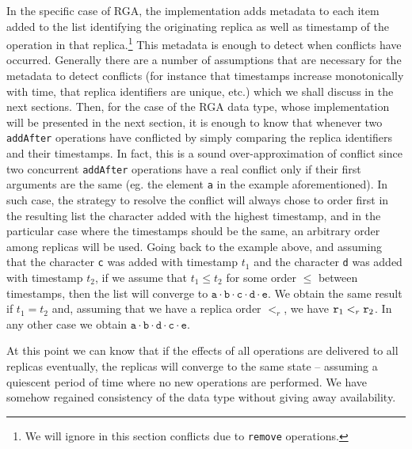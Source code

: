 

In the specific case of RGA, the implementation adds metadata to each
item added to the list identifying the originating replica as well as
timestamp of the operation in that replica.\footnote{We will ignore in
  this section conflicts due to \lstinline|remove| operations.}
%
This metadata is enough to detect when conflicts have occurred.
%
Generally there are a number of assumptions that are necessary for the
metadata to detect conflicts (for instance that timestamps increase
monotonically with time, that replica identifiers are unique, etc.)
which we shall discuss in the next sections.
%
Then, for the case of the RGA data type, whose implementation will be
presented in the next section, it is enough to know that whenever
two \lstinline|addAfter| operations have conflicted by simply
comparing the replica identifiers and their timestamps.
%
In fact, this is a sound over-approximation of conflict since two
concurrent \lstinline|addAfter| operations have a real conflict only
if their first arguments are the same (eg. the element \lstinline|a|
in the example aforementioned).
%
In such case, the strategy to resolve the conflict will always chose
to order first in the resulting list the character added with the
highest timestamp, and in the particular case where the timestamps
should be the same, an arbitrary order among replicas will be used.
%
Going back to the example above, and assuming that the character
\lstinline|c| was added with timestamp $t_1$ and the character
\lstinline|d| was added with timestamp $t_2$, if we assume that $t_1 \leq
t_2$ for some order $\leq$ between timestamps, then the list will
converge to $\mathtt{a \cdot b \cdot c \cdot d \cdot e}$.
%
We obtain the same result if $t_1 = t_2$ and, assuming that we have a replica
order $<_r$, we have $\mathtt{r}_1 <_r \mathtt{r}_2$.
%
In any other case we obtain $\mathtt{a \cdot b \cdot d \cdot c \cdot e}$.

At this point we can know that if the effects of all operations are
delivered to all replicas eventually, the replicas will converge to
the same state -- assuming a quiescent period of time where no new
operations are performed.
%
We have somehow regained consistency of the data type without
giving away availability.

